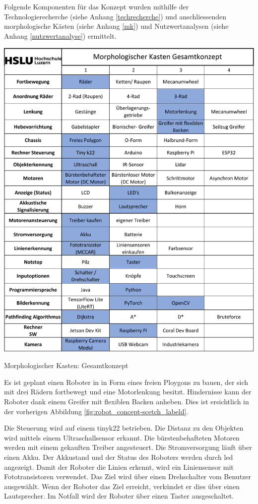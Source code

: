 Folgende Komponenten für das Konzept wurden mithilfe der Technologierecherche (siehe Anhang \ref{techrecherche}) und anschliessenden morphologische Kästen (siehe Anhang \ref{mk}) und Nutzwertanalysen (siehe Anhang \ref{nutzwertanalyse}) ermittelt. 

\begin{table}[H]
\centering
\includegraphics[width=\textwidth -20mm]{assets/MK-all.pdf}
\caption{Morphologischer Kasten: Gesamtkonzept}
\label{table:mk-all}
\end{table}

Es ist geplant einen Roboter in in Form eines freien Ploygons zu bauen, der sich mit drei Rädern fortbewegt und eine Motorlenkung besitzt. Hindernisse kann der Roboter dank einem Greifer mit flexiblen Backen anheben. Dies ist ersichtlich in der vorherigen Abbildung \ref{fig:robot_concept-scetch_labeld}.

Die Steuerung wird auf einem \acrshort{tinyk22} betrieben. Die Distanz zu den Objekten wird mittels einem Ultraschallsensor erkannt. Die bürstenbehafteten Motoren werden mit einem gekauften Treiber angesteuert. Die Stromversorgung läuft über einen Akku. Der Akkustand und der Status des Roboters werden durch \acrfull{led} angezeigt. Damit der Roboter die Linien erkennt, wird ein Liniensensor mit Fototransistoren verwendet. Das Ziel wird über einen Drehschalter vom Benutzer ausgewählt.
Wenn der Roboter das Ziel erreicht, verkündet er dies über einen Lautsprecher. Im Notfall wird der Roboter über einen Taster ausgeschaltet.

